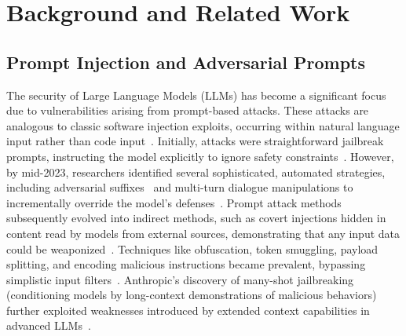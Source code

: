 \section{Background and Related Work}

\subsection{Prompt Injection and Adversarial Prompts}

The security of Large Language Models (LLMs) has become a significant focus due to vulnerabilities arising from prompt-based attacks. These attacks are analogous to classic software injection exploits, occurring within natural language input rather than code input~\cite{arthur2024promptinjection, lakera2024promptguide}. Initially, attacks were straightforward jailbreak prompts, instructing the model explicitly to ignore safety constraints~\cite{arthur2024promptinjection}. However, by mid-2023, researchers identified several sophisticated, automated strategies, including adversarial suffixes~\cite{zou2023universal} and multi-turn dialogue manipulations to incrementally override the model's defenses~\cite{zou2024oneshot}. Prompt attack methods subsequently evolved into indirect methods, such as covert injections hidden in content read by models from external sources, demonstrating that any input data could be weaponized~\cite{lakera2024promptguide, venturebeat2024prompt}. Techniques like obfuscation, token smuggling, payload splitting, and encoding malicious instructions became prevalent, bypassing simplistic input filters~\cite{learnprompting2024obfuscation}. Anthropic's discovery of many-shot jailbreaking (conditioning models by long-context demonstrations of malicious behaviors) further exploited weaknesses introduced by extended context capabilities in advanced LLMs~\cite{anthropic2024manyshot}.



